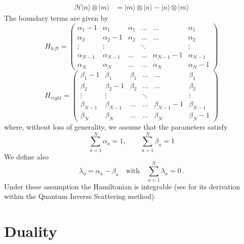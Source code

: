 \documentclass[10pt]{article}
\numberwithin{equation}{section}
\numberwithin{equation}{subsection}
\begin{document}
\begin{equation}
	\begin{split}
		\mathcal{H}|n\rangle\otimes   |m\rangle&=|m\rangle \otimes |n\rangle-|n\rangle \otimes|m\rangle
	\end{split}
\end{equation}
The boundary terms are given by 
\begin{equation}
	H_{left}=\begin{pmatrix}
		\alpha_{1}-1&\alpha_{1}&\alpha_{1}&\ldots&\ldots&\alpha_{1}\\
		\alpha_{2}&\alpha_{2}-1&\alpha_{2}&\ldots&\ldots&\alpha_{2}\\
		\vdots&\vdots& &\ddots& &\vdots\\
		\alpha_{N-1}&\alpha_{N-1}&\ldots&\ldots&\alpha_{N-1}-1&\alpha_{N-1}\\
		\alpha_{N}&\alpha_{N}&\ldots&\ldots&\alpha_{N}&\alpha_{N}-1
	\end{pmatrix}
\end{equation}
\begin{equation}
	H_{right}=\begin{pmatrix}
		\beta_{1}-1&\beta_{1}&\beta_{1}&\ldots&\ldots&\beta_{1}\\
		\beta_{2}&\beta_{2}-1&\beta_{2}&\ldots&\ldots&\beta_{2}\\
		\vdots&\vdots& &\ddots& &\vdots\\
		\beta_{N-1}&\beta_{N-1}&\ldots&\ldots&\beta_{N-1}-1&\beta_{N-1}\\
		\beta_{N}&\beta_{N}&\ldots&\ldots&\beta_{N}&\beta_{N}-1
	\end{pmatrix}
\end{equation}
where, without loss of generality,  we assume that the parameters satisfy
\begin{equation}\label{ratesConditions}
	\sum_{a=1}^{N}\alpha_{a}=1,\qquad\sum_{a=1}^{N}\beta_{a}=1
\end{equation} 
We define also 
\begin{equation}\label{lambdaConditions}
	\lambda_{a}=\alpha_{a}-\beta_{a}\quad\text{with}\quad \sum_{a=1}^{N}\lambda_{a}=0\,.
\end{equation}
Under these assumption the Hamiltonian is integrable (see \cite{vanicat2017exact} for its derivation within the Quantum Inverse Scattering method). 


\section{Duality}\label{sectionDuality}
\end{document}
